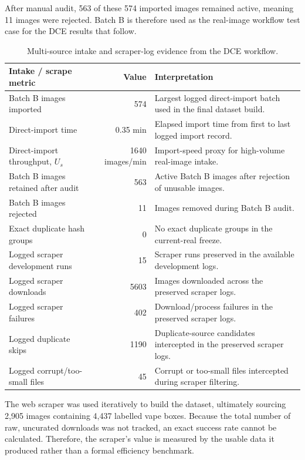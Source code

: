 After manual audit, 563 of these 574 imported images remained active, meaning 11 images were rejected. Batch B is therefore used as the real-image workflow test case for the DCE results that follow.

\begin{table}[H]
\centering
\small
\renewcommand{\arraystretch}{1.2}
\begin{tabularx}{\textwidth}{p{} r X}
\toprule
\textbf{Intake / scrape metric} & \textbf{Value} & \textbf{Interpretation} \\
\midrule
Batch B images imported & 574 & Largest logged direct-import batch used in the final dataset build. \\
Direct-import time & 0.35 min & Elapsed import time from first to last logged import record. \\
Direct-import throughput, $U_s$ & 1640 images/min & Import-speed proxy for high-volume real-image intake. \\
Batch B images retained after audit & 563 & Active Batch B images after rejection of unusable images. \\
Batch B images rejected & 11 & Images removed during Batch B audit. \\
Exact duplicate hash groups & 0 & No exact duplicate groups in the current-real freeze. \\
Logged scraper development runs & 15 & Scraper runs preserved in the available development logs. \\
Logged scraper downloads & 5603 & Images downloaded across the preserved scraper logs. \\
Logged scraper failures & 402 & Download/process failures in the preserved scraper logs. \\
Logged duplicate skips & 1190 & Duplicate-source candidates intercepted in the preserved scraper logs. \\
Logged corrupt/too-small files & 45 & Corrupt or too-small files intercepted during scraper filtering. \\
\bottomrule
\end{tabularx}
\caption{Multi-source intake and scraper-log evidence from the DCE workflow.}
\label{tab:dce_results_intake_scraping}
\end{table}

The web scraper was used iteratively to build the dataset, ultimately sourcing 2,905 images containing 4,437 labelled vape boxes. Because the total number of raw, uncurated downloads was not tracked, an exact success rate cannot be calculated. Therefore, the scraper's value is measured by the usable data it produced rather than a formal efficiency benchmark.

